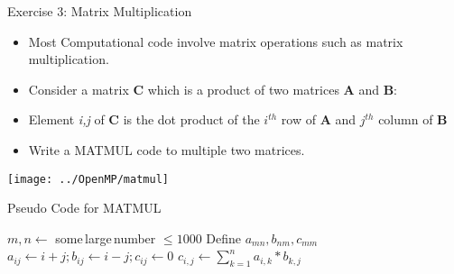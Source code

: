 \documentclass[c,mathserif,compress,xcolor=svgnames]{beamer}
\begin{document}
\begin{frame}[allowframebreaks]{Exercise 3: Matrix Multiplication}
  \begin{itemize}
    \item Most Computational code involve matrix operations such as matrix multiplication.
    \item Consider a matrix {\bf C} which is a product of two matrices {\bf A} and {\bf B}:
    \item[] Element {\it i,j} of {\bf C} is the dot product of the $i^{th}$ row of {\bf A} and $j^{th}$ column of {\bf B}
    \item Write a MATMUL code to multiple two matrices.
  \end{itemize}
  \begin{center}
    \texttt{[image: ../OpenMP/matmul]}
  \end{center}

  \begin{algorithm}[H]
    \caption{Pseudo Code for MATMUL}
    \begin{algorithmic}
      \State $m,n \gets$ some\,large\,number $\le 1000$
      \State Define $a_{mn}, b_{nm}, c_{mm}$
      \State $a_{ij} \gets i+j; b_{ij} \gets i-j; c_{ij} \gets 0$
      \State $c_{i,j} \gets \sum^{n}_{k=1} a_{i,k}*b_{k,j}$
      \EndDo
      \EndDo
    \end{algorithmic}
  \end{algorithm}
\end{frame}
\end{document}
